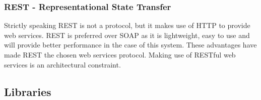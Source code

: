 \subsubsection{REST - Representational State Transfer}

Strictly speaking REST is not a protocol, but it makes use of HTTP to provide web services. REST is preferred over SOAP as it is lightweight, easy to use and will provide
better performance in the case of this system. These advantages have made REST the chosen web services protocol. Making use of RESTful web services is an architectural
constraint.

\subsection{Libraries}
